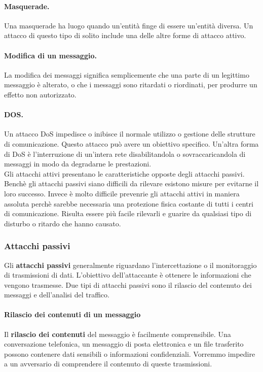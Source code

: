 \paragraph{Masquerade.}
Una masquerade ha luogo quando un'entità finge di essere un'entità diversa.
Un attacco di questo tipo di solito include una delle altre forme di attacco
attivo.

\paragraph{Modifica di un messaggio.} La modifica dei messaggi significa
semplicemente che una parte di un legittimo messaggio è alterato, o che i
messaggi sono ritardati o riordinati, per produrre un effetto non autorizzato.

\paragraph{DOS.}
Un attacco DoS impedisce o inibisce il normale utilizzo o gestione
delle strutture di comunicazione. Questo attacco può avere un obiettivo specifico.
Un'altra forma di DoS è l'interruzione di un'intera rete disabilitandola o
sovraccaricandola di messaggi in modo da degradarne le prestazioni.\\

Gli attacchi attivi presentano le caratteristiche opposte degli attacchi passivi.
Benchè gli attacchi passivi siano difficili da rilevare esistono misure per
evitarne il loro successo. Invece è molto difficile prevenrie gli attacchi
attivi in maniera assoluta perchè sarebbe necessaria una protezione fisica
costante di tutti i centri di comunicazione. Risulta essere più facile rilevarli
e guarire da qualsiasi tipo di disturbo o ritardo che hanno causato.

\subsubsection{Attacchi passivi}

Gli \textbf{attacchi passivi} generalmente riguardano l'intercettazione o il
monitoraggio di trasmissioni di dati. L'obiettivo dell'attaccante è ottenere
le informazioni che vengono trasmesse. Due tipi di attacchi passivi sono il
rilascio del contenuto dei messaggi e dell'analisi del traffico.

\paragraph{Rilascio dei contenuti di un messaggio}
Il \textbf{rilascio dei contenuti} del messaggio è facilmente comprensibile.
Una conversazione telefonica, un messaggio di posta elettronica e un file
trasferito possono contenere dati sensibili o informazioni confidenziali.
Vorremmo impedire a un avversario di comprendere il contenuto di queste
trasmissioni.

